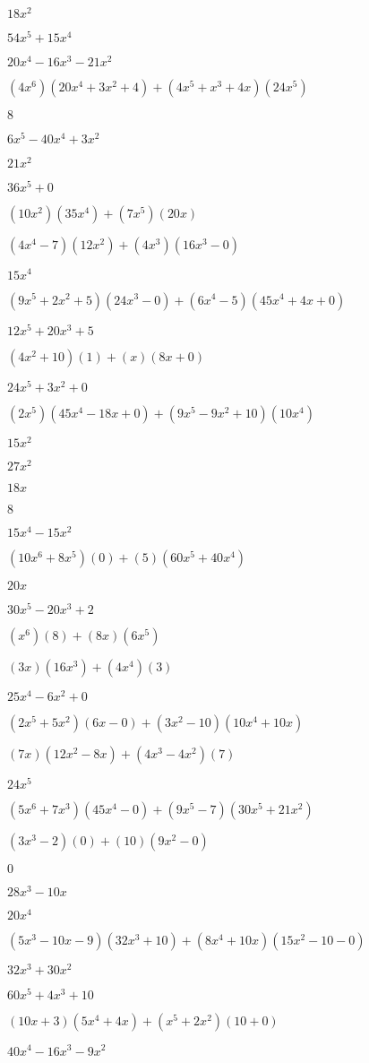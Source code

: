 \documentclass{article}
\begin{document}
\begin{multicols}{2}
$18x^{2}$\item $54x^{5}+15x^{4}$\item $20x^{4}-16x^{3}-21x^{2}$\item $(4x^{6})(20x^{4}+3x^{2}+4)+(4x^{5}+x^{3}+4x)(24x^{5})$\item $8$\item $6x^{5}-40x^{4}+3x^{2}$\item $21x^{2}$\item $36x^{5}+0$\item $(10x^2)(35x^{4})+(7x^{5})(20x)$\item $(4x^{4}-7)(12x^{2})+(4x^{3})(16x^{3}-0)$\item $15x^{4}$\item $(9x^{5}+2x^2+5)(24x^{3}-0)+(6x^{4}-5)(45x^{4}+4x+0)$\item $12x^{5}+20x^{3}+5$\item $(4x^2+10)(1)+(x)(8x+0)$\item $24x^{5}+3x^{2}+0$\item $(2x^{5})(45x^{4}-18x+0)+(9x^{5}-9x^2+10)(10x^{4})$\item $15x^{2}$\item $27x^{2}$\item $18x$\item $8$\item $15x^{4}-15x^{2}$\item $(10x^{6}+8x^{5})(0)+(5)(60x^{5}+40x^{4})$\item $20x$\item $30x^{5}-20x^{3}+2$\item $(x^{6})(8)+(8x)(6x^{5})$\item $(3x)(16x^{3})+(4x^{4})(3)$\item $25x^{4}-6x^{2}+0$\item $(2x^{5}+5x^2)(6x-0)+(3x^2-10)(10x^{4}+10x)$\item $(7x)(12x^{2}-8x)+(4x^{3}-4x^2)(7)$\item $24x^{5}$\item $(5x^{6}+7x^{3})(45x^{4}-0)+(9x^{5}-7)(30x^{5}+21x^{2})$\item $(3x^{3}-2)(0)+(10)(9x^{2}-0)$\item $0$\item $28x^{3}-10x$\item $20x^{4}$\item $(5x^{3}-10x-9)(32x^{3}+10)+(8x^{4}+10x)(15x^{2}-10-0)$\item $32x^{3}+30x^{2}$\item $60x^{5}+4x^{3}+10$\item $(10x+3)(5x^{4}+4x)+(x^{5}+2x^2)(10+0)$\item $40x^{4}-16x^{3}-9x^{2}$\item 
\end{multicols}
\end{document}
